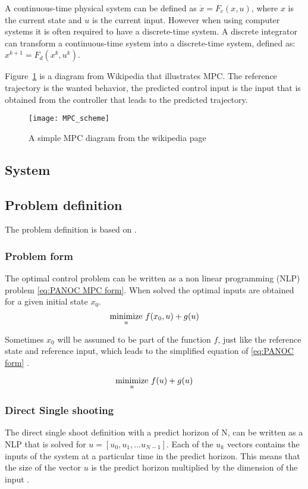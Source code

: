 	A continuous-time physical system can be defined as $\dot{x}=F_c(x,u)$, where $x$ is the current state and $u$ is the current input. However when using computer systems it is often required to have a discrete-time system. A discrete integrator can transform a continuous-time system into a discrete-time system, defined as: $x^{k+1}=F_d(x^{k},u^{k})$. 
	
	Figure~\ref{fig:MPC diagram} is a diagram from Wikipedia \cite{Wikipedia} that illustrates MPC. The reference trajectory is the wanted behavior, the predicted control input is the input that is obtained from the controller that leads to the predicted trajectory.
	\begin{figure}[h]
		\centering
		\texttt{[image: MPC\_scheme]}
		\caption{A simple MPC diagram from the wikipedia page \cite{Wikipedia}}
		\label{fig:MPC diagram}
	\end{figure}
			
	\subsection{System}
		
	\subsection{Problem definition}
	The problem definition is based on \cite{Diehl2005}.
		\subsubsection{Problem form}
			The optimal control problem can be written as a non linear programming (NLP) problem  \eqref{eq:PANOC MPC form}. When solved the optimal inputs are obtained for a given initial state $x_0$. \begin{equation}
			\underset{u}{\operatorname*{minimize}} \  f(x_0,u) + g(u)
			\label{eq:PANOC MPC form}
			\end{equation}
			
			 Sometimes $x_0$ will be assumed to be part of the function $f$, just like the reference state and reference input, which leads to the simplified equation of \eqref{eq:PANOC form} .
				
			\begin{equation}
				\underset{u}{\operatorname*{minimize}} \  f(u) + g(u)
				\label{eq:PANOC form}
			\end{equation}
		\subsubsection{Direct Single shooting}
			The direct single shoot definition with a predict horizon of N, can be written as a NLP that is solved for $u=[u_0,u_1,... u_{N-1}]$. Each of the $u_k$ vectors contains the inputs of the system at a particular time in the predict horizon. This means that the size of the vector $u$ is the predict horizon multiplied by the dimension of the input .
			

